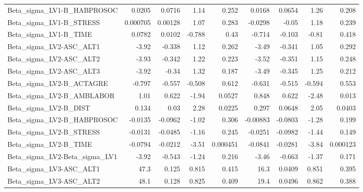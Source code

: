 \begin{tabular}{lrrrrrrrr}
Beta\_sigma\_LV1-B\_HABPROSOC    &      0.0205 &       0.0716 &    1.14 &    0.252 &     0.0168 &      0.0654 &         1.26 &         0.208 \\
Beta\_sigma\_LV1-B\_STRESS       &    0.000705 &      0.00128 &    1.07 &    0.283 &    -0.0298 &       -0.05 &         1.18 &         0.239 \\
Beta\_sigma\_LV1-B\_TIME         &      0.0782 &       0.0102 &  -0.788 &     0.43 &     -0.714 &      -0.103 &        -0.81 &         0.418 \\
Beta\_sigma\_LV2-ASC\_ALT1       &       -3.92 &       -0.338 &    1.12 &    0.262 &      -3.49 &      -0.341 &         1.05 &         0.292 \\
Beta\_sigma\_LV2-ASC\_ALT2       &       -3.93 &       -0.342 &    1.22 &    0.223 &      -3.52 &      -0.351 &         1.15 &         0.248 \\
Beta\_sigma\_LV2-ASC\_ALT3       &       -3.92 &        -0.34 &    1.32 &    0.187 &      -3.49 &      -0.345 &         1.25 &         0.212 \\
Beta\_sigma\_LV2-B\_ACTAGRE      &      -0.797 &       -0.557 &  -0.508 &    0.612 &     -0.631 &      -0.515 &       -0.594 &         0.553 \\
Beta\_sigma\_LV2-B\_AMBLABOR     &        1.01 &        0.622 &   -1.94 &   0.0527 &      0.848 &       0.622 &        -2.48 &         0.013 \\
Beta\_sigma\_LV2-B\_DIST         &       0.134 &         0.03 &    2.28 &   0.0225 &      0.297 &      0.0648 &         2.05 &        0.0403 \\
Beta\_sigma\_LV2-B\_HABPROSOC    &     -0.0135 &      -0.0962 &   -1.02 &    0.306 &   -0.00883 &     -0.0803 &        -1.28 &         0.199 \\
Beta\_sigma\_LV2-B\_STRESS       &     -0.0131 &      -0.0485 &   -1.16 &    0.245 &    -0.0251 &     -0.0982 &        -1.44 &         0.149 \\
Beta\_sigma\_LV2-B\_TIME         &     -0.0794 &      -0.0212 &   -3.51 & 0.000451 &    -0.0841 &     -0.0281 &        -3.84 &      0.000123 \\
Beta\_sigma\_LV2-Beta\_sigma\_LV1 &       -3.92 &       -0.543 &   -1.24 &    0.216 &      -3.46 &      -0.663 &        -1.37 &         0.171 \\
Beta\_sigma\_LV3-ASC\_ALT1       &        47.3 &        0.125 &   0.815 &    0.415 &       16.3 &      0.0409 &        0.851 &         0.395 \\
Beta\_sigma\_LV3-ASC\_ALT2       &        48.1 &        0.128 &   0.825 &    0.409 &       19.4 &      0.0496 &        0.862 &         0.388 \\

\end{tabular}

